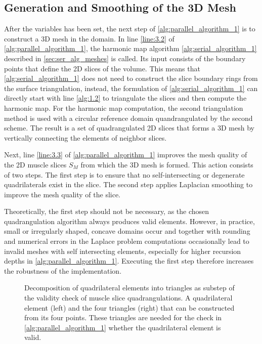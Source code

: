 
\subsection{Generation and Smoothing of the 3D Mesh}

After the  variables has been set, the next step of \cref{alg:parallel_algorithm_1} is to construct a 3D mesh in the domain.
In line \ref{line:3.2} of \cref{alg:parallel_algorithm_1}, the harmonic map  algorithm \cref{alg:serial_algorithm_1} described in \cref{sec:ser_alg_meshes} is called. Its input consists of the boundary points that define the 2D slices of the volume. This means that \cref{alg:serial_algorithm_1} does not need to construct the slice boundary rings from the surface triangulation, instead, the formulation of \cref{alg:serial_algorithm_1} can directly start with line \ref{alg:1.2} to triangulate the slices and then compute the harmonic map. For the harmonic map computation, the second triangulation method is used with a circular reference domain quandrangulated by the second scheme. The result is a set of quadrangulated 2D slices that forms a 3D mesh by vertically connecting the elements of neighbor slices.

Next, line \ref{line:3.3} of \cref{alg:parallel_algorithm_1} improves the mesh quality of the 2D muscle slices $S_M$ from which the 3D mesh is formed. This action consists of two steps. The first step is to ensure that no self-intersecting or degenerate quadrilaterals exist in the slice. The second step applies Laplacian smoothing to improve the mesh quality of the slice.

Theoretically, the first step should not be necessary, as the chosen quadrangulation algorithm always produces valid elements. However, in practice, small or irregularly shaped, concave domains occur and together with rounding and numerical errors in the Laplace problem computations occasionally lead to invalid meshes with self intersecting elements, especially for higher recursion depths in \cref{alg:parallel_algorithm_1}. Executing the first step therefore increases the robustness of the implementation.

\begin{figure}%
  \centering%
  \def\svgwidth{0.7\textwidth}%
  \caption{Decomposition of quadrilateral elements into triangles as substep of the validity check of muscle slice quadrangulations. A quadrilateral element (left) and the four triangles (right) that can be constructed from its four points. These triangles are needed for the check in \cref{alg:parallel_algorithm_1} whether the quadrilateral element is valid.}%
  \label{fig:quads_tris}%
\end{figure}%

